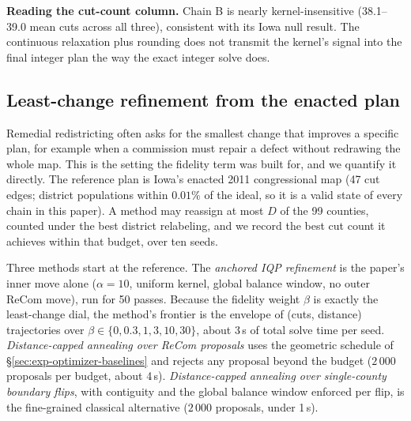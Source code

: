 \documentclass[11pt]{article}
\begin{document}
\textbf{Reading the cut-count column.} Chain B is nearly
kernel-insensitive (38.1--39.0 mean cuts across all three),
consistent with its Iowa null result. The continuous relaxation plus
rounding does not transmit the kernel's signal into the final integer
plan the way the exact integer solve does.

\subsection{Least-change refinement from the enacted plan}\label{sec:exp-leastchange}

Remedial redistricting often asks for the smallest change that
improves a specific plan, for example when a commission must repair a
defect without redrawing the whole map. This is the setting the
fidelity term was built for, and we quantify it directly. The
reference plan is Iowa's enacted 2011 congressional map (47 cut
edges; district populations within $0.01\%$ of the ideal, so it is a
valid state of every chain in this paper). A method may reassign at
most $D$ of the 99 counties, counted under the best district
relabeling, and we record the best cut count it achieves within that
budget, over ten seeds.

Three methods start at the reference. The \emph{anchored IQP
refinement} is the paper's inner move alone ($\alpha = 10$, uniform
kernel, global balance window, no outer ReCom move), run for 50
passes. Because the fidelity weight $\beta$ is exactly the
least-change dial, the method's frontier is the envelope of (cuts,
distance) trajectories over $\beta \in \{0, 0.3, 1, 3, 10, 30\}$,
about 3\,s of total solve time per seed. \emph{Distance-capped
annealing over ReCom proposals} uses the geometric schedule of
\S\ref{sec:exp-optimizer-baselines} and rejects any proposal beyond
the budget ($2\,000$ proposals per budget, about 4\,s).
\emph{Distance-capped annealing over single-county boundary flips},
with contiguity and the global balance window enforced per flip, is
the fine-grained classical alternative ($2\,000$ proposals, under
1\,s).
\end{document}
